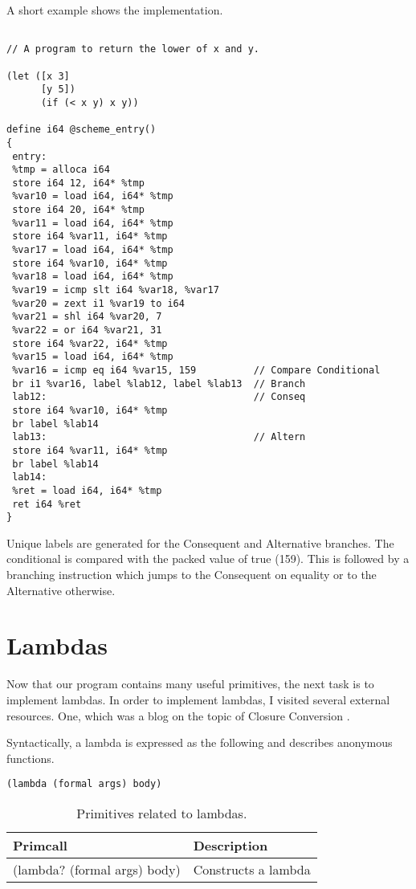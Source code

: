 \documentclass{article}
\begin{document}
A short example shows the implementation.

\begingroup
    \fontsize{8pt}{5pt}\selectfont
\begin{verbatim}

// A program to return the lower of x and y. 

(let ([x 3] 
      [y 5])
      (if (< x y) x y))

define i64 @scheme_entry()
{
 entry: 
 %tmp = alloca i64
 store i64 12, i64* %tmp
 %var10 = load i64, i64* %tmp
 store i64 20, i64* %tmp
 %var11 = load i64, i64* %tmp
 store i64 %var11, i64* %tmp
 %var17 = load i64, i64* %tmp
 store i64 %var10, i64* %tmp
 %var18 = load i64, i64* %tmp
 %var19 = icmp slt i64 %var18, %var17
 %var20 = zext i1 %var19 to i64
 %var21 = shl i64 %var20, 7
 %var22 = or i64 %var21, 31
 store i64 %var22, i64* %tmp
 %var15 = load i64, i64* %tmp
 %var16 = icmp eq i64 %var15, 159          // Compare Conditional
 br i1 %var16, label %lab12, label %lab13  // Branch
 lab12:                                    // Conseq
 store i64 %var10, i64* %tmp 
 br label %lab14                           
 lab13:                                    // Altern
 store i64 %var11, i64* %tmp 
 br label %lab14 
 lab14:
 %ret = load i64, i64* %tmp  
 ret i64 %ret
}
\end{verbatim}
\endgroup

Unique labels are generated for the Consequent and Alternative branches. The conditional is compared with the packed value of true (159). This is followed by a branching instruction which jumps to the Consequent on equality or to the Alternative otherwise.

\section{Lambdas}

Now that our program contains many useful primitives, the next task is to implement lambdas. In order to implement lambdas, I visited several external resources. One, which was a blog on the topic of Closure Conversion \cite{closure-conversion}.

Syntactically, a lambda is expressed as the following and describes anonymous functions. 

\begin{verbatim}
(lambda (formal args) body)
\end{verbatim}

\begin{table}[ht]
  \centering
\begin{tabular}{ l l }
  \toprule
  Primcall & Description \\ \hline
  \midrule
  (lambda? (formal args) body) & Constructs a lambda \\
  \bottomrule
\end{tabular}
\caption{Primitives related to lambdas.} \label{tab:lambdas}
\end{table}
\end{document}
